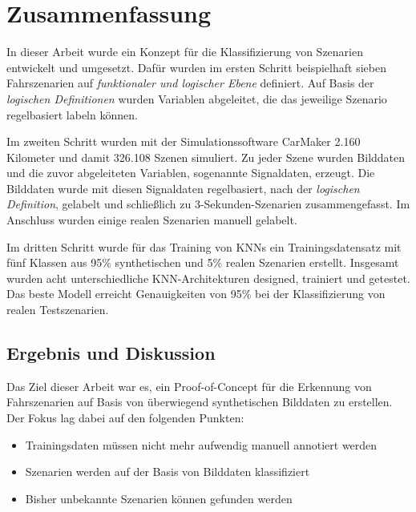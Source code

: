 
\chapter{Zusammenfassung}
\label{zusammenfassung}

In dieser Arbeit wurde ein Konzept für die Klassifizierung von Szenarien entwickelt und umgesetzt. Dafür wurden im ersten Schritt beispielhaft sieben Fahrszenarien auf \textit{funktionaler und logischer Ebene} definiert. Auf Basis der \textit{logischen Definitionen} wurden Variablen abgeleitet, die das jeweilige Szenario regelbasiert labeln können. 

Im zweiten Schritt wurden mit der Simulationssoftware CarMaker 2.160 Kilometer und damit 326.108 Szenen simuliert. Zu jeder Szene wurden Bilddaten und die zuvor abgeleiteten Variablen, sogenannte Signaldaten, erzeugt. Die Bilddaten wurde mit diesen Signaldaten regelbasiert, nach der \textit{logischen Definition}, gelabelt und schließlich zu 3-Sekunden-Szenarien zusammengefasst. Im Anschluss wurden einige realen Szenarien manuell gelabelt.

Im dritten Schritt wurde für das Training von \acp{KNN} ein Trainingsdatensatz mit fünf Klassen aus 95\% synthetischen und 5\% realen Szenarien erstellt. Insgesamt wurden acht unterschiedliche \ac{KNN}-Architekturen designed, trainiert und getestet. Das beste Modell erreicht Genauigkeiten von 95\% bei der Klassifizierung von realen Testszenarien.

\section{Ergebnis und Diskussion}
\label{zusammenfassung_ergebnis}

Das Ziel dieser Arbeit war es, ein Proof-of-Concept für die Erkennung von Fahrszenarien auf Basis von überwiegend synthetischen Bilddaten zu erstellen. Der Fokus lag dabei auf den folgenden Punkten:

\begin{itemize}
\item Trainingsdaten müssen nicht mehr aufwendig manuell annotiert werden
\item Szenarien werden auf der Basis von Bilddaten klassifiziert
\item Bisher unbekannte Szenarien können gefunden werden
\end{itemize}


